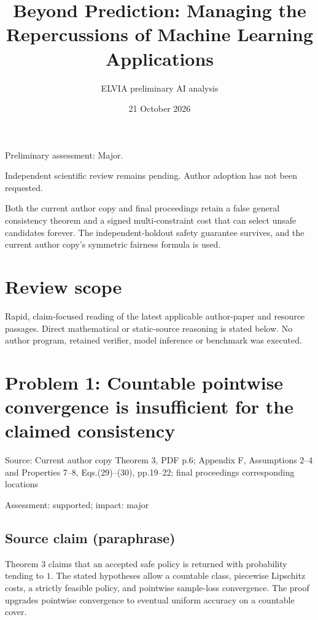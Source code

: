 \documentclass[11pt]{article}
\begin{document}
\title{Beyond Prediction: Managing the Repercussions of Machine Learning Applications}

\author{ELVIA preliminary AI analysis}\date{21 October 2026}\maketitle

Preliminary assessment: Major.\par

Independent scientific review remains pending. Author adoption has not been requested.

Both the current author copy and final proceedings retain a false general consistency theorem and a signed multi-constraint cost that can select unsafe candidates forever. The independent-holdout safety guarantee survives, and the current author copy’s symmetric fairness formula is used.

\section*{Review scope}

Rapid, claim-focused reading of the latest applicable author-paper and resource passages. Direct mathematical or static-source reasoning is stated below. No author program, retained verifier, model inference or benchmark was executed.

\section*{Problem 1: Countable pointwise convergence is insufficient for the claimed consistency}

Source: Current author copy Theorem 3, PDF p.6; Appendix F, Assumptions 2–4 and Properties 7–8, Eqs.(29)–(30), pp.19–22; final proceedings corresponding locations

Assessment: supported; impact: major

\subsection*{Source claim (paraphrase)}

Theorem 3 claims that an accepted safe policy is returned with probability tending to \(1\). The stated hypotheses allow a countable class, piecewise Lipschitz costs, a strictly feasible policy, and pointwise sample-loss convergence. The proof upgrades pointwise convergence to eventual uniform accuracy on a countable cover.
\end{document}
